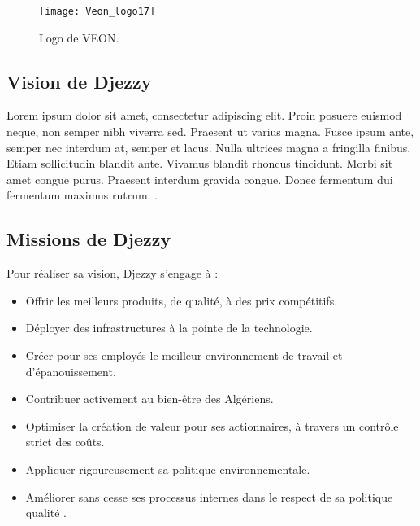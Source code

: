 \begin{figure}[hbt!]
  \centering
  \texttt{[image: Veon\_logo17]}
  \caption{Logo de VEON.}
  \label{fig:logo-veon}
\end{figure}
\FloatBarrier

\medskip

\subsection{Vision de Djezzy}
Lorem ipsum dolor sit amet, consectetur adipiscing elit. Proin posuere euismod neque, non semper nibh viverra sed. Praesent ut varius magna. Fusce ipsum ante, semper nec interdum at, semper et lacus. Nulla ultrices magna a fringilla finibus. Etiam sollicitudin blandit ante. Vivamus blandit rhoncus tincidunt. Morbi sit amet congue purus. Praesent interdum gravida congue. Donec fermentum dui fermentum maximus rutrum. \parencite{djezzy_vision_2019}.

\medskip

\subsection{Missions de Djezzy}
Pour réaliser sa vision, Djezzy s'engage à :
\begin{itemize}
  \item  Offrir les meilleurs produits, de qualité, à des prix compétitifs.
  \item  Déployer des infrastructures à la pointe de la technologie.
  \item  Créer pour ses employés le meilleur environnement de travail et d'épanouissement.
  \item Contribuer activement au bien-être des Algériens.
  \item Optimiser la création de valeur pour ses actionnaires, à travers un contrôle strict des coûts.
  \item Appliquer rigoureusement sa politique environnementale.
  \item Améliorer sans cesse ses processus internes dans le respect de sa politique qualité \parencite{djezzy_vision_2019}.
\end{itemize}

\medskip

